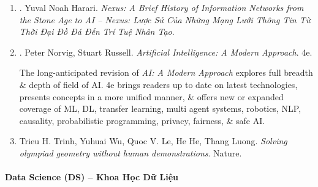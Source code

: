 \documentclass{article}
\begin{document}
\begin{enumerate}
\begin{itemize}
        \item ``An important \& timely must-read as our survival is at mercy of information.'' -- {\it Booklist}, starred review

        \item ``Confronting avalanche of books on prospects of AI, readers would do well to begin with this one.'' -- {\it Kirkus Reviews}, starred review
    \end{itemize}
    {\sf About Author.} Prof. {\sc Yuval Noah Harari} is a historian, philosopher, \& bestselling author of {\it Sapiens: A Brief History of Humankind, Homo Deus: A Brief History of Tomorrow, 21 Lessons for 21st Century}, \& series {\it Sapiens: A Graphic History \& Unstoppable Us}. He is considered 1 of world's most influential public intellectuals working today. Born in Israel in 1976, {\sc Harari} received his Ph.D. from University of Oxford in 2002. He is currently a lecturer at Department of History at Hebrew University of Jerusalem,\& a Distinguished Research Fellow at the University of Cambridge's Centre for the Study of Existential Risk. {\sc Harari} co-founded the social impact company Sapienship, focused on education \& storytelling, with his husband, {\sc Itzik Yahav}.

	\item \cite{Harari_Nexus_VN}. {\sc Yuval Noah Harari}. {\it Nexus: A Brief History of Information Networks from the Stone Age to AI -- Nexus: Lược Sử Của Những Mạng Lưới Thông Tin Từ Thời Đại Đồ Đá Đến Trí Tuệ Nhân Tạo}.\hfill{\sf[done]}

	\item \cite{Norvig_Russel2021}. {\sc Peter Norvig, Stuart Russell}. {\it Artificial Intelligence: A Modern Approach}. 4e. {}

	The long-anticipated revision of {\it AI: A Modern Approach} explores full breadth \& depth of field of AI. 4e brings readers up to date on latest technologies, presents concepts in a more unified manner, \& offers new or expanded coverage of ML, DL, transfer learning, multi agent systems, robotics, NLP, causality, probabilistic programming, privacy, fairness, \& safe AI.

	\item {\sc Trieu H. Trinh, Yuhuai Wu, Quoc V. Le, He He, Thang Luong}. {\it Solving olympiad geometry without human demonstrations}. Nature.\hfill{\sf[reading]}
\end{enumerate}

\paragraph{Data Science (DS) -- Khoa Học Dữ Liệu}
\end{document}
